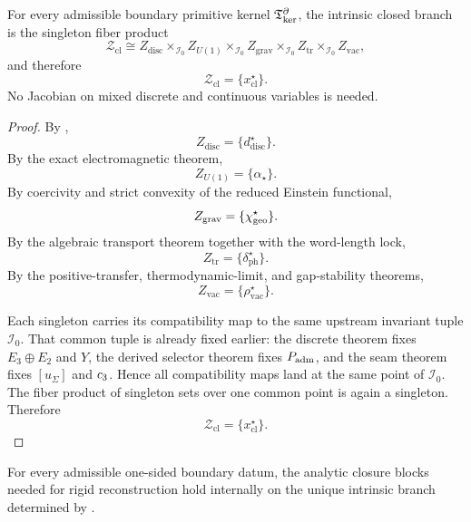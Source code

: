 
\begin{theorem}
\label{thm:intrinsic-closed-branch}
\label{thm:observation-closure}
\label{thm:singleton-fiber-product-branch}
For every admissible boundary primitive kernel $\mathfrak T_{\mathrm{ker}}^\partial$, the intrinsic closed branch is the
singleton fiber product
\[
\mathcal Z_{\mathrm{cl}}
\cong
Z_{\mathrm{disc}}
\times_{\mathcal I_0}
Z_{U(1)}
\times_{\mathcal I_0}
Z_{\mathrm{grav}}
\times_{\mathcal I_0}
Z_{\mathrm{tr}}
\times_{\mathcal I_0}
Z_{\mathrm{vac}},
\]
and therefore
\[
\mathcal Z_{\mathrm{cl}}=\{x_{\mathrm{cl}}^\star\}.
\]
No Jacobian on mixed discrete and continuous variables is needed.
\end{theorem}

\begin{proof}
By ,
\[
Z_{\mathrm{disc}}=\{d^\star_{\mathrm{disc}}\}.
\]
By the exact electromagnetic theorem,
\[
Z_{U(1)}=\{\alpha_\star\}.
\]
By coercivity and strict convexity of the reduced Einstein functional,
\[
Z_{\mathrm{grav}}=\{\chi_{\mathrm{geo}}^\star\}.
\]
By the algebraic transport theorem together with the word-length lock,
\[
Z_{\mathrm{tr}}=\{\delta_{\mathrm{ph}}^\star\}.
\]
By the positive-transfer, thermodynamic-limit, and gap-stability theorems,
\[
Z_{\mathrm{vac}}=\{\rho_{\mathrm{vac}}^\star\}.
\]

Each singleton carries its compatibility map to the same upstream invariant tuple $\mathcal I_0$.
That common tuple is already fixed earlier: the discrete theorem fixes $E_3\oplus E_2$ and $Y$,
the derived selector theorem fixes $P_{\mathrm{adm}}$, and the seam theorem fixes $[u_\Sigma]$ and $c_3$.
Hence all compatibility maps land at the same point of $\mathcal I_0$. The fiber product of
singleton sets over one common point is again a singleton. Therefore
\[
\mathcal Z_{\mathrm{cl}}=\{x_{\mathrm{cl}}^\star\}.
\]
\end{proof}

\begin{theorem}
\label{thm:internal-analytic-closure}
\label{thm:internal-analytic-closure-hard}
For every admissible one-sided boundary datum, the analytic closure blocks needed for rigid
reconstruction hold internally on the unique intrinsic branch determined by
.
\end{theorem}

